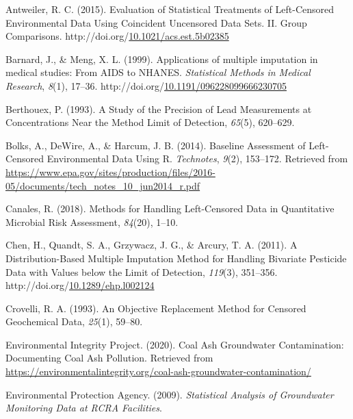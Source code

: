 \documentclass[12pt, twoside]{amherstthesis}
\newenvironment{CSLReferences}%
  {}%
  {\par}
\begin{document}
\hypertarget{refs}{}
\begin{CSLReferences}{1}{0}
\leavevmode\hypertarget{ref-Antweiler2015}{}%
Antweiler, R. C. (2015). {Evaluation of Statistical Treatments of Left-Censored Environmental Data Using Coincident Uncensored Data Sets. II. Group Comparisons}. http://doi.org/\href{https://doi.org/10.1021/acs.est.5b02385}{10.1021/acs.est.5b02385}

\leavevmode\hypertarget{ref-Barnard1999}{}%
Barnard, J., \& Meng, X. L. (1999). {Applications of multiple imputation in medical studies: From AIDS to NHANES}. \emph{Statistical Methods in Medical Research}, \emph{8}(1), 17--36. http://doi.org/\href{https://doi.org/10.1191/096228099666230705}{10.1191/096228099666230705}

\leavevmode\hypertarget{ref-Berthouex1993}{}%
Berthouex, P. (1993). {A Study of the Precision of Lead Measurements at Concentrations Near the Method Limit of Detection}, \emph{65}(5), 620--629.

\leavevmode\hypertarget{ref-Bolks2014}{}%
Bolks, A., DeWire, A., \& Harcum, J. B. (2014). {Baseline Assessment of Left-Censored Environmental Data Using R}. \emph{Technotes}, \emph{9}(2), 153--172. Retrieved from \url{https://www.epa.gov/sites/production/files/2016-05/documents/tech_notes_10_jun2014_r.pdf}

\leavevmode\hypertarget{ref-Canales2018}{}%
Canales, R. (2018). {Methods for Handling Left-Censored Data in Quantitative Microbial Risk Assessment}, \emph{84}(20), 1--10.

\leavevmode\hypertarget{ref-Chen2011}{}%
Chen, H., Quandt, S. A., Grzywacz, J. G., \& Arcury, T. A. (2011). {A Distribution-Based Multiple Imputation Method for Handling Bivariate Pesticide Data with Values below the Limit of Detection}, \emph{119}(3), 351--356. http://doi.org/\href{https://doi.org/10.1289/ehp.l002124}{10.1289/ehp.l002124}

\leavevmode\hypertarget{ref-Crovelli1993}{}%
Crovelli, R. A. (1993). {An Objective Replacement Method for Censored Geochemical Data}, \emph{25}(1), 59--80.

\leavevmode\hypertarget{ref-EIP2020}{}%
Environmental Integrity Project. (2020). {Coal Ash Groundwater Contamination: Documenting Coal Ash Pollution}. Retrieved from \url{https://environmentalintegrity.org/coal-ash-groundwater-contamination/}

\leavevmode\hypertarget{ref-EPA2009}{}%
Environmental Protection Agency. (2009). \emph{{Statistical Analysis of Groundwater Monitoring Data at RCRA Facilities}}.


\end{CSLReferences}
\end{document}
